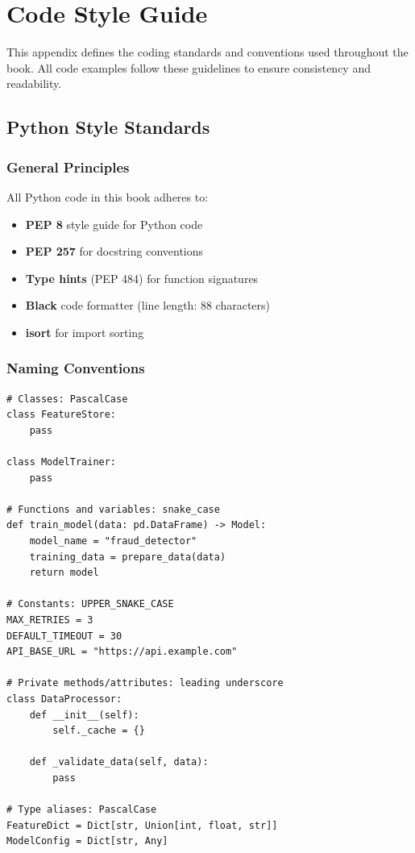 \chapter{Code Style Guide}

This appendix defines the coding standards and conventions used throughout the book. All code examples follow these guidelines to ensure consistency and readability.

\section{Python Style Standards}

\subsection{General Principles}

All Python code in this book adheres to:

\begin{itemize}
    \item \textbf{PEP 8} style guide for Python code
    \item \textbf{PEP 257} for docstring conventions
    \item \textbf{Type hints} (PEP 484) for function signatures
    \item \textbf{Black} code formatter (line length: 88 characters)
    \item \textbf{isort} for import sorting
\end{itemize}

\subsection{Naming Conventions}

\begin{lstlisting}[style=python, caption=Naming Convention Examples]
# Classes: PascalCase
class FeatureStore:
    pass

class ModelTrainer:
    pass

# Functions and variables: snake_case
def train_model(data: pd.DataFrame) -> Model:
    model_name = "fraud_detector"
    training_data = prepare_data(data)
    return model

# Constants: UPPER_SNAKE_CASE
MAX_RETRIES = 3
DEFAULT_TIMEOUT = 30
API_BASE_URL = "https://api.example.com"

# Private methods/attributes: leading underscore
class DataProcessor:
    def __init__(self):
        self._cache = {}

    def _validate_data(self, data):
        pass

# Type aliases: PascalCase
FeatureDict = Dict[str, Union[int, float, str]]
ModelConfig = Dict[str, Any]
\end{lstlisting}

